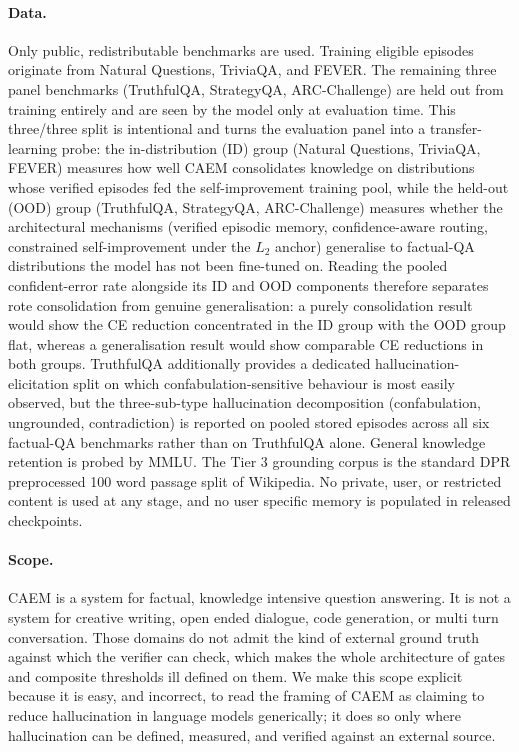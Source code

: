 \paragraph{Data.} Only public, redistributable benchmarks are used. Training eligible episodes originate from Natural Questions, TriviaQA, and FEVER. The remaining three panel benchmarks (TruthfulQA, StrategyQA, ARC-Challenge) are held out from training entirely and are seen by the model only at evaluation time. This three/three split is intentional and turns the evaluation panel into a transfer-learning probe: the in-distribution (ID) group (Natural Questions, TriviaQA, FEVER) measures how well CAEM consolidates knowledge on distributions whose verified episodes fed the self-improvement training pool, while the held-out (OOD) group (TruthfulQA, StrategyQA, ARC-Challenge) measures whether the architectural mechanisms (verified episodic memory, confidence-aware routing, constrained self-improvement under the $L_2$ anchor) generalise to factual-QA distributions the model has not been fine-tuned on. Reading the pooled confident-error rate alongside its ID and OOD components therefore separates rote consolidation from genuine generalisation: a purely consolidation result would show the CE reduction concentrated in the ID group with the OOD group flat, whereas a generalisation result would show comparable CE reductions in both groups. TruthfulQA additionally provides a dedicated hallucination-elicitation split on which confabulation-sensitive behaviour is most easily observed, but the three-sub-type hallucination decomposition (confabulation, ungrounded, contradiction) is reported on pooled stored episodes across all six factual-QA benchmarks rather than on TruthfulQA alone. General knowledge retention is probed by MMLU. The Tier 3 grounding corpus is the standard DPR preprocessed 100 word passage split of Wikipedia. No private, user, or restricted content is used at any stage, and no user specific memory is populated in released checkpoints.

\paragraph{Scope.} CAEM is a system for factual, knowledge intensive question answering. It is not a system for creative writing, open ended dialogue, code generation, or multi turn conversation. Those domains do not admit the kind of external ground truth against which the verifier can check, which makes the whole architecture of gates and composite thresholds ill defined on them. We make this scope explicit because it is easy, and incorrect, to read the framing of CAEM as claiming to reduce hallucination in language models generically; it does so only where hallucination can be defined, measured, and verified against an external source.

